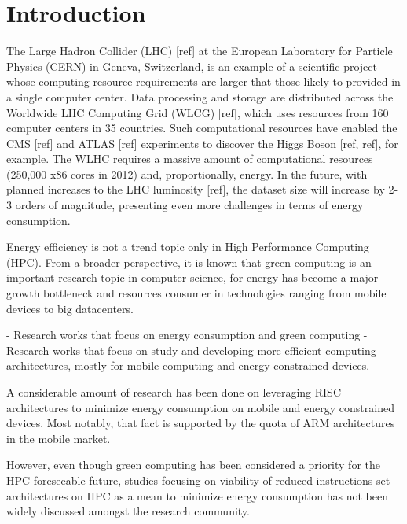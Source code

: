 \chapter{Introduction}



The Large Hadron Collider (LHC) [ref] at the European Laboratory for Particle
Physics (CERN) in Geneva, Switzerland, is an example of a scientific project whose computing resource requirements are larger that those likely to provided in a single computer
center. Data processing and storage are distributed across the Worldwide LHC
Computing Grid (WLCG) [ref], which uses resources from 160 computer centers in 35
countries. Such computational resources have enabled the CMS [ref] and ATLAS [ref]
experiments to discover the Higgs Boson [ref, ref], for example. The WLHC requires a
massive amount of computational resources (250,000 x86 cores in 2012) and,
proportionally, energy. In the future, with planned increases to the LHC
luminosity [ref], the dataset size will increase by 2-3 orders of magnitude,
presenting even more challenges in terms of energy consumption.

Energy efficiency is not a trend topic only in High Performance Computing (HPC).
From a  broader perspective, it is known that green computing is an important
research topic in computer science, for energy has become a major growth
bottleneck and resources consumer in technologies ranging from mobile devices to
big datacenters. 
   
- Research works that focus on energy consumption and green computing
- Research works that focus on study and developing more efficient computing 
architectures, mostly for mobile computing and energy constrained devices.


A considerable amount of research has been done on leveraging RISC architectures
to minimize energy consumption on mobile and energy constrained devices. Most
notably, that fact is supported by the quota of ARM architectures in the mobile
market.

However, even though green computing has been considered a priority for the 
HPC foreseeable future, studies focusing on viability of reduced instructions set 
architectures on HPC as a mean to minimize energy consumption has not been widely 
discussed amongst the research community. 

